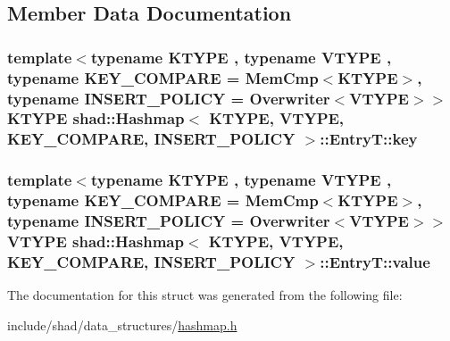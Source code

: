 \subsection{Member Data Documentation}
\hypertarget{structshad_1_1Hashmap_1_1EntryT_a645bc59daa16e8d0780489e5fbaa3b64}{
\subsubsection[{key}]{\setlength{\rightskip}{0pt plus 5cm}template$<$typename K\-T\-Y\-P\-E , typename V\-T\-Y\-P\-E , typename K\-E\-Y\-\_\-\-C\-O\-M\-P\-A\-R\-E  = Mem\-Cmp$<$\-K\-T\-Y\-P\-E$>$, typename I\-N\-S\-E\-R\-T\-\_\-\-P\-O\-L\-I\-C\-Y  = Overwriter$<$\-V\-T\-Y\-P\-E$>$$>$ K\-T\-Y\-P\-E {\bf shad\-::\-Hashmap}$<$ K\-T\-Y\-P\-E, V\-T\-Y\-P\-E, K\-E\-Y\-\_\-\-C\-O\-M\-P\-A\-R\-E, I\-N\-S\-E\-R\-T\-\_\-\-P\-O\-L\-I\-C\-Y $>$\-::Entry\-T\-::key}}\label{structshad_1_1Hashmap_1_1EntryT_a645bc59daa16e8d0780489e5fbaa3b64}
\hypertarget{structshad_1_1Hashmap_1_1EntryT_ab7cd1b889d5ce8f620b6457c19995c75}{
\subsubsection[{value}]{\setlength{\rightskip}{0pt plus 5cm}template$<$typename K\-T\-Y\-P\-E , typename V\-T\-Y\-P\-E , typename K\-E\-Y\-\_\-\-C\-O\-M\-P\-A\-R\-E  = Mem\-Cmp$<$\-K\-T\-Y\-P\-E$>$, typename I\-N\-S\-E\-R\-T\-\_\-\-P\-O\-L\-I\-C\-Y  = Overwriter$<$\-V\-T\-Y\-P\-E$>$$>$ V\-T\-Y\-P\-E {\bf shad\-::\-Hashmap}$<$ K\-T\-Y\-P\-E, V\-T\-Y\-P\-E, K\-E\-Y\-\_\-\-C\-O\-M\-P\-A\-R\-E, I\-N\-S\-E\-R\-T\-\_\-\-P\-O\-L\-I\-C\-Y $>$\-::Entry\-T\-::value}}\label{structshad_1_1Hashmap_1_1EntryT_ab7cd1b889d5ce8f620b6457c19995c75}


The documentation for this struct was generated from the following file\-:\begin{DoxyCompactItemize}
\item 
include/shad/data\-\_\-structures/\hyperlink{hashmap_8h}{hashmap.\-h}\end{DoxyCompactItemize}
